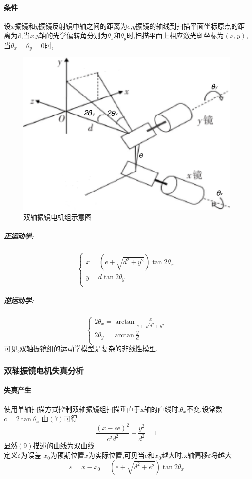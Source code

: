 \documentclass[a4paper,12pt,onecolumn,twoside]{article}
\begin{document}
\paragraph{条件}
设$x$振镜和$y$振镜反射镜中轴之间的距离为$e$,$y$振镜的轴线到扫描平面坐标原点的距离为d,当$x$,$y$轴的光学偏转角分别为$\theta_x$和$\theta_y$时,扫描平面上相应激光斑坐标为$(x,y)$,当$\theta_x=\theta_y=0$时,
\begin{figure}[ht]
\includegraphics[width=\linewidth]{MG6.png}
\caption{双轴振镜电机组示意图}
\end{figure}
\subparagraph{正运动学:}
\begin{equation}
\left\{
\begin{array}{l}
x=(e+\sqrt{d^2+y^2})\tan 2\theta_x \\
y=d\tan 2\theta_y \\
\end{array}
\right.
\end{equation}
\subparagraph{逆运动学:}
\begin{equation}
\left\{
\begin{array}{l}
2\theta_x = \arctan \frac{x}{e+\sqrt{d^2+y^2}}  \\
2\theta_y = \arctan \frac{y}{d} \\
\end{array}
\right.
\end{equation}
可见,双轴振镜组的运动学模型是复杂的非线性模型.
\newpage
\subsubsection{双轴振镜电机失真分析}
\paragraph{失真产生}
使用单轴扫描方式控制双轴振镜组扫描垂直于x轴的直线时,$\theta_x$不变,设常数$c=2\tan\theta_x$
由$(7)$可得
\begin{equation}
\frac{(x-ce)^2}{c^2 d^2}-\frac{y^2}{d^2}=1
\end{equation}
显然$(9)$描述的曲线为双曲线\\
定义$\varepsilon$为误差 $x_0$为预期位置$x$为实际位置,可见当$e$和$x_0$越大时,x轴偏移$\varepsilon$将越大
\begin{equation}
\varepsilon=x-x_0=(e+\sqrt{d^2+e^2})\tan2\theta_x
\end{equation}
\end{document}
